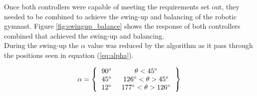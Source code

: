 Once both controllers were capable of meeting the requirements set out, they needed to be combined to achieve the swing-up and balancing of the robotic gymnast. Figure \ref{fig:swingup_balance} shows the response of both controllers combined that achieved the swing-up and balancing.\\

During the swing-up the $\alpha$ value was reduced by the algorithm as it pass through the positions seen in equation (\ref{eq:alpha}).

\begin{equation}
\label{eq:alpha}
\alpha = 
\left \{
\begin{tabular}{cc}
$ \SI{90}{\degree}$\: & $  \theta < \SI{45}{\degree} 	$\\
$ \SI{45}{\degree}$\: & $  \SI{126}{\degree} < \theta > \SI{45}{\degree} $\\
$ \SI{12}{\degree}$\: & $ \SI{177}{\degree} < \theta > \SI{126}{\degree}$ \\
\end{tabular}
\right \}
\end{equation}
